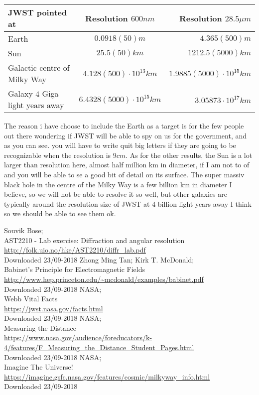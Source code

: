 \documentclass[11pt, A4paper, english]{article}
\begin{document}
	\begin{tabular}{|l|c|r|}
\hline
JWST pointed at & Resolution $600 nm$ & Resolution $28.5 \mu m$ \\
\hline
Earth & $0.0918(50) m$ & $4.365(500) m$ \\
Sun & $25.5(50) km$ & $1212.5(5000) km$ \\
Galactic centre of Milky Way & $4.128(500) \cdot 10^{13} km$ & $1.9885(5000) \cdot 10^{15} km$ \\
Galaxy $4$ Giga light years away & $6.4328(5000) \cdot 10^{15} km$ & $3.05873 \cdot 10^{17} km$ \\
\hline
	\end{tabular}
	\begin{multicols}{2}
The reason i have choose to include the Earth as a target is for the few people out there wondering if JWST will be able to spy on us for the government, and as you can see. you will have to write quit big letters if they are going to be recognizable when the resolution is $9 cm$. As for the other results, the Sun is a lot larger than resolution here, almost half million km in diameter, if I am not to of and you will be able to se a good bit of detail on its surface. The super massiv black hole in the centre of the Milky Way is a few billion km in diameter I believe, so we will not be able to resolve it so well, but other galaxies are typically around the resolution size of JWST at 4 billion light years away I think so we should be able to see them ok.
		\begin{thebibliography}{9}
Souvik Bose; \\
AST2210 - Lab exercise: Diffraction and angular resolution \\
\url{http://folk.uio.no/hke/AST2210/diffr_lab.pdf} \\
Downloaded 23/09-2018
Zhong Ming Tan; Kirk T. McDonald; \\
Babinet’s Principle for Electromagnetic Fields \\
\url{http://www.hep.princeton.edu/~mcdonald/examples/babinet.pdf} \\
Downloaded 23/09-2018
NASA; \\
Webb Vital Facts \\
\url{https://jwst.nasa.gov/facts.html} \\
Downloaded 23/09-2018
NASA; \\
Measuring the Distance \\
\url{https://www.nasa.gov/audience/foreducators/k-4/features/F_Measuring_the_Distance_Student_Pages.html} \\
Downloaded 23/09-2018
NASA; \\
Imagine The Universe! \\
\url{https://imagine.gsfc.nasa.gov/features/cosmic/milkyway_info.html} \\
Downloaded 23/09-2018
		\end{thebibliography}
	\end{multicols}
\end{document}
